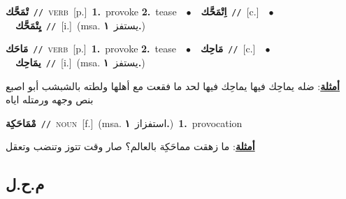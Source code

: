 \documentclass[10pt,a4paper,twoside]{article} %
\begin{document}
\begin{multicols}{2}
{\setlength\topsep{0pt}\textbf{\foreignlanguage{arabic}{تْمَحَّك}}\ {\color{gray}\texttt{//}\color{black}}\ \textsc{verb}\ [p.]\ \textbf{1.}~provoke  \textbf{2.}~tease\ \ $\bullet$\ \ \setlength\topsep{0pt}\textbf{\foreignlanguage{arabic}{اِتْمَحَّك}}\ {\color{gray}\texttt{//}\color{black}}\ [c.]\ \ $\bullet$\ \ \setlength\topsep{0pt}\textbf{\foreignlanguage{arabic}{يِتْمَحَّك}}\ {\color{gray}\texttt{//}\color{black}}\ [i.]\ \color{gray}(msa. \foreignlanguage{arabic}{يستفز}~\foreignlanguage{arabic}{\textbf{١.}})\color{black}\ } \vspace{2mm}

{\setlength\topsep{0pt}\textbf{\foreignlanguage{arabic}{مَاحَك}}\ {\color{gray}\texttt{//}\color{black}}\ \textsc{verb}\ [p.]\ \textbf{1.}~provoke  \textbf{2.}~tease\ \ $\bullet$\ \ \setlength\topsep{0pt}\textbf{\foreignlanguage{arabic}{مَاحِك}}\ {\color{gray}\texttt{//}\color{black}}\ [c.]\ \ $\bullet$\ \ \setlength\topsep{0pt}\textbf{\foreignlanguage{arabic}{يمَاحِك}}\ {\color{gray}\texttt{//}\color{black}}\ [i.]\ \color{gray}(msa. \foreignlanguage{arabic}{يستفز}~\foreignlanguage{arabic}{\textbf{١.}})\color{black}\  \begin{flushright}\color{gray}\foreignlanguage{arabic}{\textbf{\underline{\foreignlanguage{arabic}{أمثلة}}}: ضله يماحِك فيها يماحِك فيها لحد ما فقعت مع أهلها ولطته بالشبشب أبو اصبع بنص وجهه ورمتله اياه}\end{flushright}\color{black}} \vspace{2mm}

{\setlength\topsep{0pt}\textbf{\foreignlanguage{arabic}{مْمَاحَكِة}}\ {\color{gray}\texttt{//}\color{black}}\ \textsc{noun}\ [f.]\ \color{gray}(msa. \foreignlanguage{arabic}{استفزاز}~\foreignlanguage{arabic}{\textbf{١.}})\color{black}\ \textbf{1.}~provocation\  \begin{flushright}\color{gray}\foreignlanguage{arabic}{\textbf{\underline{\foreignlanguage{arabic}{أمثلة}}}: ما زهقت مماحَكِة بالعالم؟ صار وقت تتوز وتنضب وتعقل}\end{flushright}\color{black}} \vspace{2mm}

\vspace{-3mm}
\subsection*{\color{blue}\foreignlanguage{arabic}{م.ح.ل}\color{blue}{}} 


\end{multicols}
\end{document}
